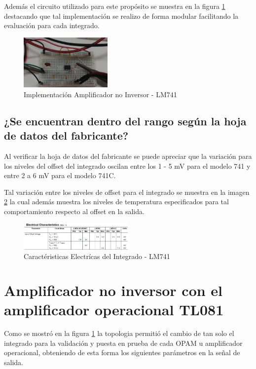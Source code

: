 \documentclass[conference]{IEEEtran}
\begin{document}
	Además el circuito utilizado para este propósito se muestra en la figura \ref{fig:implementacion-lm741} destacando que tal implementación se realizo de forma modular facilitando la evaluación para cada integrado.
	
	\begin{figure}[h]
		\centering
		\includegraphics[width=0.4\textwidth]{media/implementacion-lm741}
		\caption{Implementación Amplificador no Inversor - LM741}
		\label{fig:implementacion-lm741}
	\end{figure}
	
	\subsection{¿Se encuentran dentro del rango según la hoja de datos del fabricante?}
	Al verificar la hoja de datos del fabricante se puede apreciar que la variación para los niveles del offset del integrado oscilan entre los 1 - 5 mV para el modelo 741 y entre 2 a 6 mV para el modelo 741C.
	
	Tal variación entre los niveles de offset para el integrado se muestra en la imagen \ref{fig:offset-datasheet-lm741} la cual además muestra los niveles de temperatura especificados para tal comportamiento respecto al offset en la salida.
	
	\begin{figure}[h]
		\centering
		\includegraphics[width=0.5\textwidth]{media/offset-datasheet-lm741}
		\caption{Caractéristicas Electrícas del Integrado - LM741}
		\label{fig:offset-datasheet-lm741}
	\end{figure}

	\section{Amplificador no inversor con el amplificador operacional TL081}
	
	Como se mostró en la figura \ref{fig:implementacion-lm741} la topologia permitió el cambio de tan solo el integrado para la validación y puesta en prueba de cada OPAM u amplificador operacional, obteniendo de esta forma los siguientes parámetros en la señal de salida.
	
\end{document}
